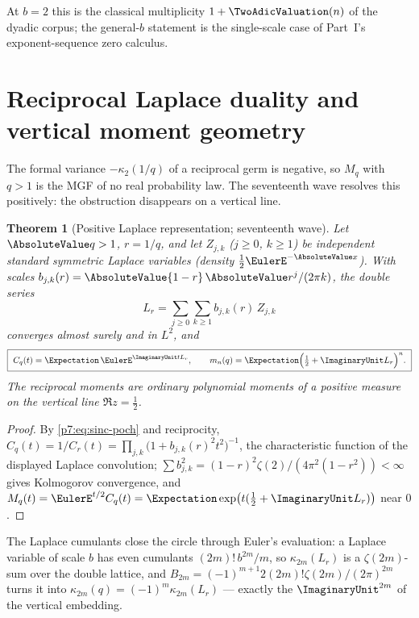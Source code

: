 \documentclass[11pt,oneside]{article}
\numberwithin{equation}{section}
\newtheorem{theorem}{Theorem}[section]
\theoremstyle{definition}
\theoremstyle{remark}
\begin{document}
At $b=2$ this is the classical multiplicity $1+\TwoAdicValuation(n)$ of the dyadic
corpus; the general-$b$ statement is the single-scale case of Part~I's
exponent-sequence zero calculus.
\section{Reciprocal Laplace duality and vertical moment geometry}
\label{p7:sec:laplace-dual}

The formal variance $-\kappa_2(1/q)$ of a reciprocal germ is negative, so
$M_q$ with $q>1$ is the MGF of no real probability law.  The seventeenth wave
resolves this positively: the obstruction disappears on a vertical line.

\begin{theorem}[Positive Laplace representation; seventeenth wave]
\label{p7:thm:laplace-dual}
Let $\AbsoluteValue q>1$, $r=1/q$, and let $Z_{j,k}$ ($j\ge0$, $k\ge1$) be independent
standard symmetric Laplace variables (density $\tfrac12\EulerE^{-\AbsoluteValue x}$).  With
scales $b_{j,k}(r)=\AbsoluteValue{1-r}\,\AbsoluteValue r^j/(2\pi k)$, the double series
\begin{equation}\label{p7:eq:Lr}
 L_{r}=\sum_{j\ge0}\sum_{k\ge1}b_{j,k}(r)\,Z_{j,k}
\end{equation}
converges almost surely and in $L^2$, and
\begin{equation}\label{p7:eq:C-laplace}
 \boxed{\ C_q(t)=\Expectation\,\EulerE^{\ImaginaryUnit tL_{r}},
 \qquad
 m_n(q)=\Expectation\Bigl(\tfrac12+\ImaginaryUnit L_{r}\Bigr)^{n}.\ }
\end{equation}
The reciprocal moments are ordinary polynomial moments of a positive measure
on the vertical line $\Re z=\tfrac12$.
\end{theorem}

\begin{proof}
By \eqref{p7:eq:sinc-poch} and reciprocity,
$C_q(t)=1/C_r(t)=\prod_{j,k}\bigl(1+b_{j,k}(r)^2t^2\bigr)^{-1}$, the
characteristic function of the displayed Laplace convolution;
$\sum b_{j,k}^2=(1-r)^2\zeta(2)/(4\pi^2(1-r^2))<\infty$ gives Kolmogorov
convergence, and $M_q(t)=\EulerE^{t/2}C_q(t)=\Expectation\exp\bigl(t(\tfrac12+\ImaginaryUnit
L_r)\bigr)$ near $0$.
\end{proof}

The Laplace cumulants close the circle through Euler's evaluation: a Laplace
variable of scale $b$ has even cumulants $(2m)!\,b^{2m}/m$, so
$\kappa_{2m}(L_r)$ is a $\zeta(2m)$-sum over the double lattice, and
$B_{2m}=(-1)^{m+1}2(2m)!\zeta(2m)/(2\pi)^{2m}$ turns it into
$\kappa_{2m}(q)=(-1)^m\kappa_{2m}(L_r)$ --- exactly the $\ImaginaryUnit^{2m}$ of the
vertical embedding.
\end{document}
